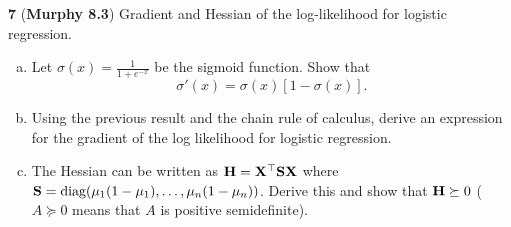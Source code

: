 \documentclass[12pt,letterpaper,fleqn]{hmcpset}
\begin{document}
\textbf{7} (\textbf{Murphy 8.3}) Gradient and Hessian of the log-likelihood for
logistic regression.
\begin{enumerate}[(a)]
    \item Let $\sigma(x) = \frac{1}{1 + e^{-x}}$ be the sigmoid function. Show that
        \[
            \sigma'(x) = \sigma(x)\left[1 - \sigma(x)\right].
        \]
    \item Using the previous result and the chain rule of calculus, derive an
        expression for the gradient of the log likelihood for logistic regression.
    \item The Hessian can be written as ${\bf H}={\bf X}^\top{\bf S}{\bf X}$ where ${\bf S} =
        {\hbox{diag}}(\mu_1(1-\mu_1), \dots, \mu_n(1-\mu_n))$. Derive this and show that
        ${\bf H} \succeq 0$ ($A \succeq 0$ means that $A$ is positive semidefinite).
\end{enumerate}

\vspace{20mm}
\end{document}
